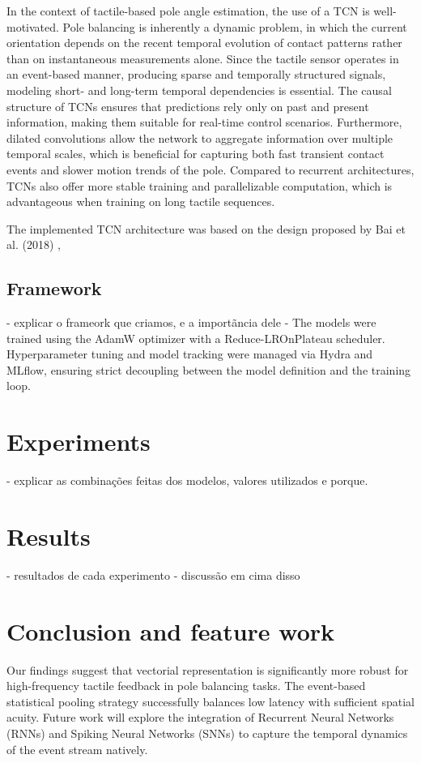 \documentclass{article}
\begin{document}
In the context of tactile-based pole angle estimation, the use of a TCN
is well-motivated. Pole balancing is inherently
a dynamic problem, in which the current orientation depends on the recent temporal
evolution of contact patterns rather than on instantaneous measurements alone.
Since the tactile sensor operates in an event-based manner,
producing sparse and temporally structured signals,
modeling short- and long-term temporal dependencies is essential.
The causal structure of TCNs ensures that predictions rely only on past and
present information, making them suitable for real-time control scenarios.
Furthermore, dilated convolutions allow the network to aggregate information
over multiple temporal scales, which is beneficial for capturing both fast
transient contact events and slower motion trends of the pole.
Compared to recurrent architectures, TCNs also offer more stable training
and parallelizable computation, which is advantageous when training on long
tactile sequences.

The implemented TCN architecture was based on the design proposed by Bai et al. (2018) \cite{bai2018empirical},


\subsection{Framework}
- explicar o frameork que criamos, e a importãncia dele
- The models were trained using the AdamW optimizer with a Reduce-LROnPlateau scheduler. Hyperparameter tuning and model tracking were managed via Hydra and MLflow, ensuring strict decoupling between the model definition and the training loop. 
\section{Experiments}
- explicar as combinações feitas dos modelos, valores utilizados e porque.
\section{Results}
- resultados de cada experimento
- discussão em cima disso
\section{Conclusion and feature work}
Our findings suggest that vectorial representation is significantly more robust for high-frequency tactile feedback in pole balancing tasks. The event-based statistical pooling strategy successfully balances low latency with sufficient spatial acuity. Future work will explore the integration of Recurrent Neural Networks (RNNs) and Spiking Neural Networks (SNNs) to capture the temporal dynamics of the event stream natively.




\end{document}
